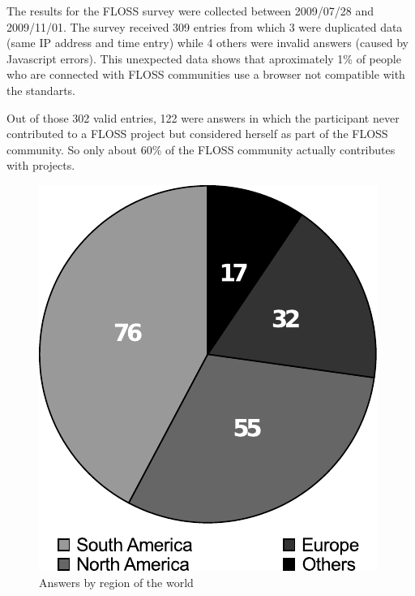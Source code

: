 \documentclass[lnbip]{svmultln}
\begin{document}
The results for the FLOSS survey were collected between 2009/07/28 and
2009/11/01. The survey received 309 entries from which 3 were
duplicated data (same IP address and time entry) while 4 others were
invalid answers (caused by Javascript errors). This unexpected data
shows that aproximately 1\% of people who are connected with FLOSS
communities use a browser not compatible with the standarts.

Out of those 302 valid entries, 122 were answers in which the
participant never contributed to a FLOSS project but considered
herself as part of the FLOSS community. So only about 60\% of the
FLOSS community actually contributes with projects.

\begin{figure}[htb]
  \begin{minipage}[t]{0.5\linewidth}
    \includegraphics[scale=0.8]{floss-world.pdf}
    \caption{Answers by region of the world}
    \label{fig:floss-world}
  \end{minipage}
  \begin{minipage}[t]{0.5\linewidth}

\end{minipage}
\end{figure}
\end{document}
